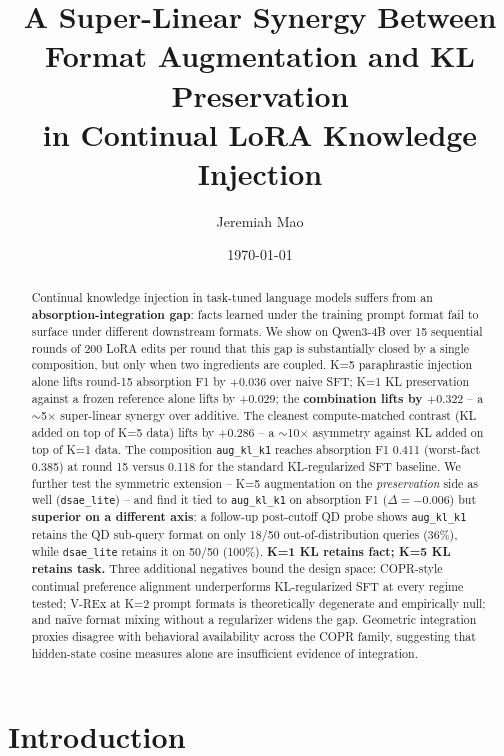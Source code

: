 \documentclass[11pt]{article}
\title{A Super-Linear Synergy Between Format Augmentation and KL Preservation \\
       in Continual LoRA Knowledge Injection}
\author{Jeremiah Mao}
\date{\today}
\newcommand{\code}[1]{\texttt{\small #1}}
\begin{document}
\maketitle

\begin{abstract}
Continual knowledge injection in task-tuned language models suffers from an
\textbf{absorption-integration gap}: facts learned under the training prompt
format fail to surface under different downstream formats. We show on
Qwen3-4B over 15 sequential rounds of 200 LoRA edits per round that this gap
is substantially closed by a single composition, but only when two
ingredients are coupled. K=5 paraphrastic injection
\citep{allenzhu2023knowledge} alone lifts round-15 absorption F1 by $+0.036$
over naive SFT; K=1 KL preservation against a frozen reference alone lifts
by $+0.029$; the \textbf{combination lifts by $+0.322$} -- a $\sim$5$\times$
super-linear synergy over additive. The cleanest compute-matched contrast
(KL added on top of K=5 data) lifts by $+0.286$ -- a $\sim$10$\times$
asymmetry against KL added on top of K=1 data. The composition
\code{aug\_kl\_k1} reaches absorption F1 0.411 (worst-fact 0.385) at round 15
versus 0.118 for the standard KL-regularized SFT baseline. We further test
the symmetric extension -- K=5 augmentation on the \emph{preservation}
side as well (\code{dsae\_lite}) -- and find it tied to \code{aug\_kl\_k1}
on absorption F1 ($\Delta = -0.006$) but \textbf{superior on a different
axis}: a follow-up post-cutoff QD probe shows \code{aug\_kl\_k1} retains
the QD sub-query format on only 18/50 out-of-distribution queries (36\%),
while \code{dsae\_lite} retains it on 50/50 (100\%).
\textbf{K=1 KL retains fact; K=5 KL retains task.} Three additional
negatives bound the design space: COPR-style continual preference
alignment underperforms KL-regularized SFT at every regime tested; V-REx
at K=2 prompt formats is theoretically degenerate and empirically null;
and na\"ive format mixing without a regularizer widens the gap.
Geometric integration proxies disagree with behavioral availability
across the COPR family, suggesting that hidden-state cosine measures
alone are insufficient evidence of integration.
\end{abstract}

\section{Introduction}
\end{document}
